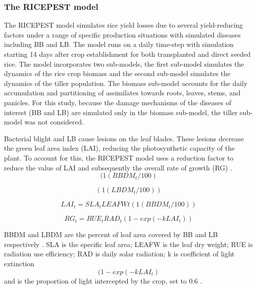 \documentclass[preprint,12pt]{elsarticle}
\begin{document}
\subsubsection{The RICEPEST model}
The RICEPEST model \cite{Willocquet2000, Willocquet2002} simulates rice yield losses due to several yield-reducing factors under a range of specific production situations with simulated diseases including BB and LB. The model runs on a daily time-step with simulation starting 14 days after crop establishment for both transplanted and direct seeded rice. The model incorporates two sub-models, the first sub-model simulates the dynamics of the rice crop biomass and the second sub-model simulates the dynamics of the tiller population. The biomass sub-model accounts for the daily accumulation and partitioning of assimilates towards roots, leaves, stems, and panicles. For this study, because the damage mechanisms of the diseases of interest (BB and LB) are simulated only in the biomass sub-model, the tiller sub-model was not considered.

Bacterial blight and LB cause lesions on the leaf blades. These lesions decrease the green leaf area index (LAI), reducing the photosynthetic capacity of the plant. To account for this, the RICEPEST model uses a reduction factor to reduce the value of LAI and subsequently the overall rate of growth (RG) \cite{Willocquet2002}. 
\begin{equation}
(1  (BBDM_t / 100)
\end{equation}

\begin{equation}
(1  (LBDM_t / 100))
\end{equation}

\begin{equation}
LAI_t = SLA_t  LEAFWt  (1  (BBDM_t / 100)) 
\end{equation}
 
\begin{equation}
RG_t = RUE_t  RAD_t  (1- exp(- k  LAI_t))
\end{equation}

BBDM and LBDM are the percent of leaf area covered by BB and LB respectively \cite{Willocquet2002}. SLA is the specific leaf area; LEAFW is the leaf dry weight; RUE is radiation use efficiency; RAD is daily solar radiation; k is coefficient of light extinction 
\begin{equation}
(1- exp( - k  LAI_t)
\end{equation}
and is the proportion of light intercepted by the crop, set to 0.6 \cite{Willocquet2000}.
\end{document}
